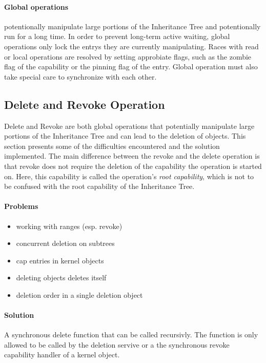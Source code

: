 \paragraph{Global operations} potentionally manipulate large portions of the Inheritance Tree and potentionally run for a long time. In order to prevent long-term active waiting, global operations only lock the entrys they are currently manipulating. Races with read or local operations are resolved by setting approbiate flags, such as the zombie flag of the capability or the pinning flag of the entry. Global operation must also take special care to synchronize with each other.


\subsection{Delete and Revoke Operation}

Delete and Revoke are both global operations that potentially manipulate large portions of the Inheritance Tree and can lead to the deletion of objects. This section presents some of the difficulties encountered and the solution implemented. The main difference between the revoke and the delete operation is that revoke does not require the deletion of the capability the operation is started on. Here, this capability is called the operation's \emph{root capability}, which is not to be confused with the root capability of the Inheritance Tree.

\paragraph{Problems}

\begin{itemize}
\item working with ranges (esp. revoke)
\item concurrent deletion on subtrees
\item cap entries in kernel objects
\item deleting objects deletes itself
\item deletion order in a single deletion object
\end{itemize}

\paragraph{Solution}

A synchronous delete function that can be called recursivly. The function is only allowed to be called by the deletion servive or a the synchronous revoke capability handler of a kernel object.

